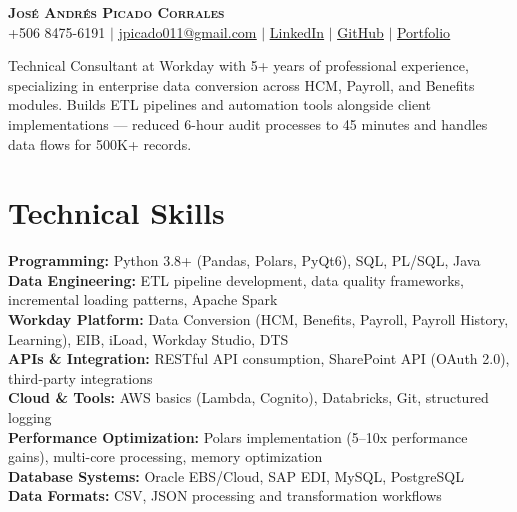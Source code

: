 \documentclass[letterpaper,11pt]{article}
\begin{document}
\begin{center}
    \textbf{\Huge \scshape José Andrés Picado Corrales} \\ \vspace{1pt}
    \small +506 8475-6191 $|$
    \href{mailto:jpicado011@gmail.com}{\underline{jpicado011@gmail.com}} $|$
    \href{https://linkedin.com/in/josé-andrés-picado-corrales-a10a28173}{\underline{LinkedIn}} $|$
    \href{https://github.com/josepicado07}{\underline{GitHub}} $|$
    \href{https://josepicado07.github.io/Portafolio_Jose_Picado/}{\underline{Portfolio}}
\end{center}

\vspace{-10pt}
\begin{center}
    \small{Technical Consultant at Workday with 5+ years of professional experience, specializing in enterprise data conversion across HCM, Payroll, and Benefits modules. Builds ETL pipelines and automation tools alongside client implementations — reduced 6-hour audit processes to 45 minutes and handles data flows for 500K+ records.}
\end{center}

\section{Technical Skills}
\begin{itemize}[leftmargin=0.15in, label={}]
    \small{\item{
     \textbf{Programming:} Python 3.8+ (Pandas, Polars, PyQt6), SQL, PL/SQL, Java \\
     \textbf{Data Engineering:} ETL pipeline development, data quality frameworks, incremental loading patterns, Apache Spark \\
     \textbf{Workday Platform:} Data Conversion (HCM, Benefits, Payroll, Payroll History, Learning), EIB, iLoad, Workday Studio, DTS \\
     \textbf{APIs \& Integration:} RESTful API consumption, SharePoint API (OAuth 2.0), third-party integrations \\
     \textbf{Cloud \& Tools:} AWS basics (Lambda, Cognito), Databricks, Git, structured logging \\
     \textbf{Performance Optimization:} Polars implementation (5--10x performance gains), multi-core processing, memory optimization \\
     \textbf{Database Systems:} Oracle EBS/Cloud, SAP EDI, MySQL, PostgreSQL \\
     \textbf{Data Formats:} CSV, JSON processing and transformation workflows
    }}
\end{itemize}
\end{document}
